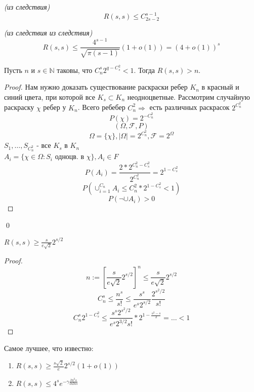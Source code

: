 \begin{corollary}
    \emph{(из следствия)}
    $$R(s,s) \le C_{2s-2}^{s-1}$$
\end{corollary}

\begin{corollary}
    \emph{(из следствия из следствия)}
    $$R(s,s) \le \frac{4^{s-1}}{\sqrt{\pi(s-1)}}(1 + o(1)) = (4 + o(1))^s$$
\end{corollary}

\begin{theorem}
    Пусть $n$ и $s \in \mathbb{N}$ таковы, что $C_n^s 2^{q-C_s^2} < 1$. Тогда $R(s,s) > n$.
    \begin{proof}
        Нам нужно доказать существование раскраски ребер $K_n$ в красный и синий цвета, при которой все $K_s \subset K_n$ неодноцветные.
        Рассмотрим случайную раскраску $\chi$ ребер у $K_n$. Всего ребебер $C_n^2 \Rightarrow $ есть различных раскрасок $2^{C_n^2}$
        $$P(\chi)=2^{-C_n^2}$$
        $$(\Omega, \mathcal{F}, P)$$
        $$\Omega = \{\chi\}, |\Omega| = 2 ^ {C_n^2}, \mathcal{F} = 2^{\Omega}$$
        $S_1,\ldots,S_{C_n^2}$ - все $K_s$ в $K_n$\\
        $A_i = \{\chi \in \Omega: S_i$ одноцв. в $\chi\}, A_i \in F$
        $$P(A_i)=\frac{2*2^{C_n^2-C_s^2}}{2^{C_n^2}}=2^{1-C_s^2}$$
        $$P(\cup^{C_n}_{i=1}A_i \le C_n^2*2^{1-C_s^2} < 1)$$
        $$P(\neg \cup A_i) > 0$$
    \end{proof}
    \qed
\end{theorem}

\begin{corollary}
    $R(s,s) \ge \frac{s}{e\sqrt{2}}2^{s/2}$
    \begin{proof}
        $$n:=\left[ \frac{s}{e\sqrt{2}} 2^{s/2} \right]^n \le \frac{s}{e\sqrt{2}}2^{s/2}$$
        $$C_n^s \le \frac{n^s}{s!} \le \frac{s^s}{e^s2^{s/2}}\frac{2^{s^2/2}}{s!}$$
        $$C_n^s2^{1-C_s^2} \le \frac{s^s2^{s^2/2}}{e^s2^{3/2}s!}*2^{1-\frac{s^2-s}{2}}=\ldots <1$$
    \end{proof}
\end{corollary}



Самое лучшее, что известно:
\begin{enumerate}
    \item $ R(s,s) \ge \frac{s\sqrt 2}{e}2^{s/2}(1 + o(1))$
    \item $ R(s,s) \le 4^{s}e^{-\gamma\frac{ln^2s}{ln ln s}}$
\end{enumerate}

